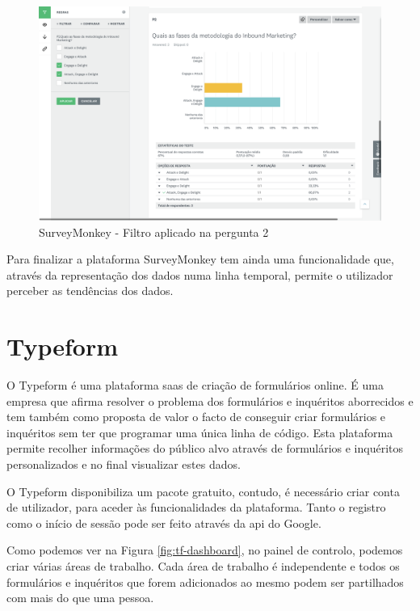 \begin{figure}[ht!]
	\begin{center}
		\includegraphics[width=1\textwidth]{img/sm/surveymonkey-form-filtro1}
		\caption{SurveyMonkey - Filtro aplicado na pergunta 2 }
		\label{fig:surveymonkey-form-filtro1}
	\end{center}
\end{figure}

Para finalizar a plataforma SurveyMonkey tem ainda uma funcionalidade que, através da representação dos dados numa linha temporal, permite o utilizador perceber as tendências dos dados.

\section{Typeform}
\label{typeform}

O Typeform é uma plataforma \acrshort{saas} de criação de formulários online. É uma empresa que afirma resolver o problema dos formulários e inquéritos aborrecidos e tem também como proposta de valor o facto de conseguir criar formulários e inquéritos sem ter que programar uma única linha de código. Esta plataforma permite recolher informações do público alvo através de formulários e inquéritos personalizados e no final visualizar estes dados. 

O Typeform disponibiliza um pacote gratuito, contudo, é necessário criar conta de utilizador, para aceder às funcionalidades da plataforma. Tanto o registro como o início de sessão pode ser feito através da \acrfull{api} do Google.

Como podemos ver na Figura \ref{fig:tf-dashboard}, no painel de controlo, podemos criar várias áreas de trabalho. Cada área de trabalho é independente e todos os formulários e inquéritos que forem adicionados ao mesmo podem ser partilhados com mais do que uma pessoa.

